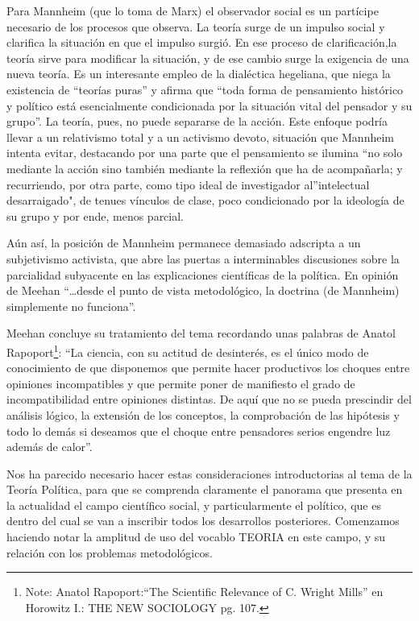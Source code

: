 \documentclass[
]{book}
\begin{document}
Para Mannheim (que lo toma de Marx) el observador social es un partícipe necesario de los procesos que observa. La teoría surge de un impulso social y clarifica la situación en que el impulso surgió. En ese proceso de clarificación,la teoría sirve para modificar la situación, y de ese cambio surge la exigencia de una nueva teoría. Es un interesante empleo de la dialéctica hegeliana, que niega la existencia de ``teorías puras'' y afirma que ``toda forma de pensamiento histórico y político está esencialmente condicionada por la situación vital del pensador y su grupo''. La teoría, pues, no puede separarse de la acción. Este enfoque podría llevar a un relativismo total y a un activismo devoto, situación que Mannheim intenta evitar, destacando por una parte que el pensamiento se ilumina ``no solo mediante la acción sino también mediante la reflexión que ha de acompañarla; y recurriendo, por otra parte, como tipo ideal de investigador al''intelectual desarraigado", de tenues vínculos de clase, poco condicionado por la ideología de su grupo y por ende, menos parcial.

Aún así, la posición de Mannheim permanece demasiado adscripta a un subjetivismo activista, que abre las puertas a interminables discusiones sobre la parcialidad subyacente en las explicaciones científicas de la política. En opinión de Meehan ``\ldots desde el punto de vista metodológico, la doctrina (de Mannheim) simplemente no funciona''.

Meehan concluye su tratamiento del tema recordando unas palabras de Anatol Rapoport\footnote{Note: Anatol Rapoport:``The Scientific Relevance of C. Wright Mills'' en Horowitz I.: THE NEW SOCIOLOGY pg. 107.}: ``La ciencia, con su actitud de desinterés, es el único modo de conocimiento de que disponemos que permite hacer productivos los choques entre opiniones incompatibles y que permite poner de manifiesto el grado de incompatibilidad entre opiniones distintas. De aquí que no se pueda prescindir del análisis lógico, la extensión de los conceptos, la comprobación de las hipótesis y todo lo demás si deseamos que el choque entre pensadores serios engendre luz además de calor''.

Nos ha parecido necesario hacer estas consideraciones introductorias al tema de la Teoría Política, para que se comprenda claramente el panorama que presenta en la actualidad el campo científico social, y particularmente el político, que es dentro del cual se van a inscribir todos los desarrollos posteriores. Comenzamos haciendo notar la amplitud de uso del vocablo TEORIA en este campo, y su relación con los problemas metodológicos.
\end{document}
